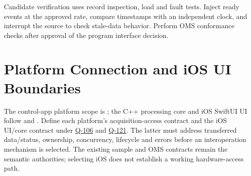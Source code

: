 Candidate verification uses record inspection, load and fault tests. Inject
ready events at the approved rate, compare timestamps with an independent
clock, and interrupt the source to check stale-data behavior. Perform OMS
conformance checks after approval of the program interface decision.

\section{Platform Connection and iOS UI Boundaries}
The control-app platform scope is ; the C++ processing core and iOS SwiftUI UI follow  and . Define each platform's acquisition-access contract and the iOS UI/core contract under \hyperref[Question:Q-106]{Q-106} and \hyperref[Question:Q-121]{Q-121}. The latter must address transferred data/status, ownership, concurrency, lifecycle and errors before an interoperation mechanism is selected. The existing sample and OMS contracts remain the semantic authorities; selecting iOS does not establish a working hardware-access path.
